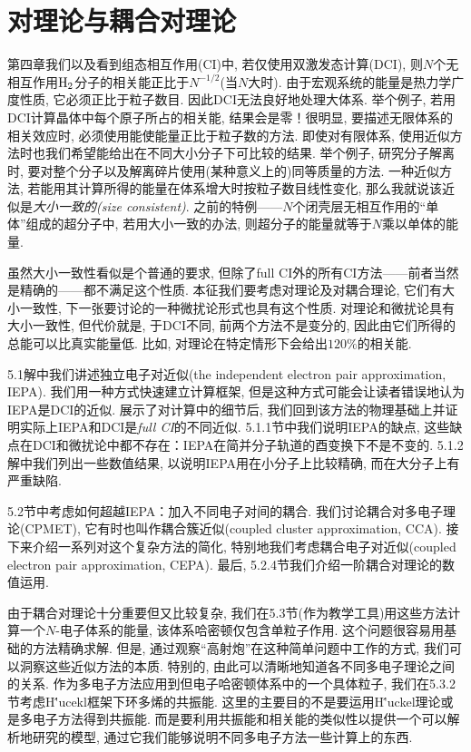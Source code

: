 \chapter{对理论与耦合对理论}
第四章我们以及看到组态相互作用(CI)中, 若仅使用双激发态计算(DCI), 则$N$个无相互作用$\mathrm{H}_2$分子的相关能正比于$N^{-1/2}$(当$N$大时). 由于宏观系统的能量是热力学广度性质, 它必须正比于粒子数目. 因此DCI无法良好地处理大体系. 举个例子, 若用DCI计算晶体中每个原子所占的相关能, 结果会是零！很明显, 要描述无限体系的相关效应时, 必须使用能使能量正比于粒子数的方法. 即使对有限体系, 使用近似方法时也我们希望能给出在不同大小分子下可比较的结果. 举个例子, 研究分子解离时, 要对整个分子以及解离碎片使用(某种意义上的)同等质量的方法. 一种近似方法, 若能用其计算所得的能量在体系增大时按粒子数目线性变化, 那么我就说该近似是\emph{大小一致的(size consistent)}. 之前的特例——$N$个闭壳层无相互作用的``单体''组成的超分子中, 若用大小一致的办法, 则超分子的能量就等于$N$乘以单体的能量.

虽然大小一致性看似是个普通的要求, 但除了full CI外的所有CI方法——前者当然是精确的——都不满足这个性质. 本征我们要考虑对理论及对耦合理论, 它们有大小一致性, 下一张要讨论的一种微扰论形式也具有这个性质. 对理论和微扰论具有大小一致性, 但代价就是, 于DCI不同, 前两个方法不是变分的, 因此由它们所得的总能可以比真实能量低. 比如, 对理论在特定情形下会给出$120\%$的相关能.

5.1解中我们讲述独立电子对近似(the independent electron pair approximation, IEPA). 我们用一种方式快速建立计算框架, 但是这种方式可能会让读者错误地认为IEPA是DCI的近似. 展示了对计算中的细节后, 我们回到该方法的物理基础上并证明实际上IEPA和DCI是\emph{full CI}的不同近似. 5.1.1节中我们说明IEPA的缺点, 这些缺点在DCI和微扰论中都不存在：IEPA在简并分子轨道的酉变换下不是不变的. 5.1.2解中我们列出一些数值结果, 以说明IEPA用在小分子上比较精确, 而在大分子上有严重缺陷.

5.2节中考虑如何超越IEPA：加入不同电子对间的耦合. 我们讨论耦合对多电子理论(CPMET), 它有时也叫作耦合簇近似(coupled cluster approximation, CCA). 接下来介绍一系列对这个复杂方法的简化, 特别地我们考虑耦合电子对近似(coupled electron pair approximation, CEPA). 最后, 5.2.4节我们介绍一阶耦合对理论的数值运用.

由于耦合对理论十分重要但又比较复杂, 我们在5.3节(作为教学工具)用这些方法计算一个$N$-电子体系的能量, 该体系哈密顿仅包含单粒子作用. 这个问题很容易用基础的方法精确求解. 但是, 通过观察``高射炮''在这种简单问题中工作的方式, 我们可以洞察这些近似方法的本质. 特别的, 由此可以清晰地知道各不同多电子理论之间的关系. 作为多电子方法应用到但电子哈密顿体系中的一个具体粒子, 我们在5.3.2节考虑H\''ucekl框架下环多烯的共振能. 这里的主要目的不是要运用H\''uckel理论或是多电子方法得到共振能. 而是要利用共振能和相关能的类似性以提供一个可以解析地研究的模型, 通过它我们能够说明不同多电子方法一些计算上的东西. 
